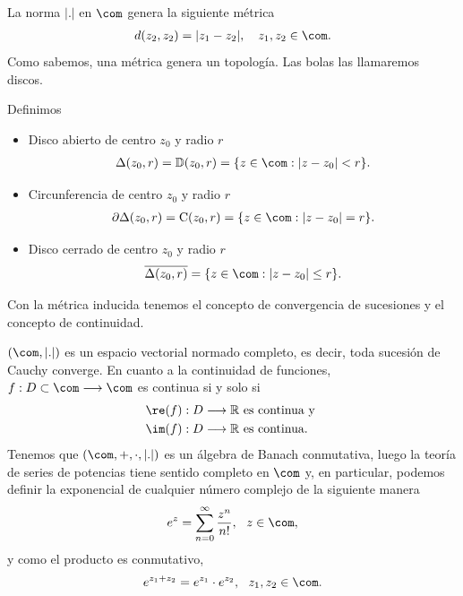 La norma $|.|$ en $\com$ genera la siguiente métrica
\begin{align*}
    d(z_2,z_2) = |z_1 - z_2|, \ \ \ z_1,z_2 \in \com.
\end{align*}
Como sabemos, una métrica genera un topología. Las bolas las llamaremos discos.
\begin{defi}
Definimos
\begin{itemize}
    \item Disco abierto de centro $z_0$ y radio $r$
    \begin{align*}
        \Delta(z_0,r) = \mathbb{D}(z_0,r) = \{z \in \com : |z - z_0| < r \}.
    \end{align*}
    \item Circunferencia de centro $z_0$ y radio $r$
    \begin{align*}
        \partial \Delta(z_0,r) = \text{C}(z_0,r) = \{z \in \com : |z - z_0| =  r \}.
    \end{align*}
    \item Disco cerrado de centro $z_0$ y radio $r$
    \begin{align*}
        \overline{\Delta(z_0,r)} = \{z \in \com : |z - z_0| \leq r \}.
    \end{align*}
\end{itemize}
\end{defi}
Con la métrica inducida tenemos el concepto de convergencia de sucesiones y el concepto de continuidad.
\begin{obs}
$(\com, |.|)$ es un espacio vectorial normado completo, es decir, toda sucesión de Cauchy converge. En cuanto a la continuidad de funciones, $f: D \subset \com \longrightarrow \com$ es continua si y solo si
\begin{align*}
    &\re(f) : D \longrightarrow \mathbb{R} \text{ es continua y } \\
    &\im(f) : D \longrightarrow \mathbb{R} \text{ es continua}.
\end{align*}
Tenemos que $(\com, +, \cdot, |.|)$ es un álgebra de Banach conmutativa, luego la teoría de series de potencias tiene sentido completo en $\com$ y, en particular, podemos definir la exponencial de cualquier número complejo de la siguiente manera
\begin{align*}
    e^z = \sum_{n=0}^{\infty}{\frac{z^n}{n!}}, \ \ z \in \com,
\end{align*}
y como el producto es conmutativo,
\begin{align*}
    e^{z_1 + z_2} = e^{z_1} \cdot e^{z_2}, \ \ z_1,z_2 \in \com.
\end{align*}
\end{obs}
